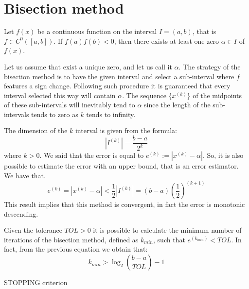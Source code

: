 \documentclass[12pt, a4paper]{report}
\newtheorem[style=M,bodystyle=\normalfont]{theorem}{Theorem}
\newtheorem[style=M,bodystyle=\normalfont]{corollary}{Corollary}
\newtheorem[style=M,bodystyle=\normalfont]{lemma}{Lemma}
\newtheorem[style=M,bodystyle=\normalfont]{definition}{Definition}
\begin{document}
    \section{Bisection method}
    \begin{theorem}
        Let $f(x)$ be a continuous function on the interval $I=(a,b)$, that is $f \in C^0([a,b])$. 
        If $f(a)f(b)<0$, then there exists at least one zero $\alpha \in I$ of $f(x)$. 
    \end{theorem}
    Let us assume that exist a unique zero, and let us call it $\alpha$. 
    The strategy of the bisection method is to have the given interval and select a sub-interval where $f$ features a sign change. Following 
    such procedure it is guaranteed that every interval selected this way will contain $\alpha$. The sequence $\{x^{(k)}\}$ of the midpoints of 
    these sub-intervals will inevitably tend to $\alpha$ since the length of the sub-intervals tends to zero as $k$ tends to infinity.

    The dimension of the $k$ interval is given from the formula: 
    \[\left\lvert I^{(k)} \right\rvert = \dfrac{b-a}{2^k}\]
    where $k>0$. We said that the error is equal to $e^{(k)}:=\left\lvert x^{(k)} - \alpha \right\rvert$. So, it is also possible to estimate 
    the error with an upper bound, that is an error estimator. We have that. 
    \[e^{(k)} = \left\lvert x^{(k)} - \alpha \right\rvert < \dfrac{1}{2} \left\lvert I^{(k)} \right\rvert = (b-a)\left( \dfrac{1}{2} \right)^{(k+1)}\]
    This result implies that this method is convergent, in fact the error is monotonic descending. 

    Given the tolerance $TOL>0$ it is possible to calculate the minimum number of iterations of the bisection method, defined as $k_{min}$, such
    that $e^{(k_{min})}<TOL$. In fact, from the previous equation we obtain that: 
    \[k_{min}>\log_2\left( \dfrac{b-a}{TOL}\right) -1\]


    STOPPING criterion
\end{document}
